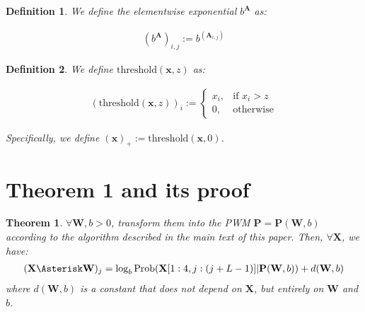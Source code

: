 \documentclass[12pt]{article}
\newcommand{\vect}[1]{\mathbf{#1}}
\newcommand{\matrixSymbol}[1]{\mathbf{#1}}
\newtheorem{theorem}{Theorem}
\newtheorem{definition}{Definition}
\begin{document}
\begin{definition}
We define the elementwise exponential ${b}^{\matrixSymbol{A}}$ as:

\begin{align}
\left( {b}^{\matrixSymbol{A}} \right)_{i, j} := {b}^{\left( \matrixSymbol{A}_{i, j} \right)}
\end{align}
\end{definition}

\begin{definition}
We define $\mathrm{threshold}(\vect{x}, z)$ as:

\begin{align}
(\mathrm{threshold}(\vect{x}, z))_{i} := \begin{cases}x_i, & \text{if } x_i > z \\ 0, & \text{otherwise} \end{cases}
\end{align}

Specifically, we define $(\vect{x})_{+} := \mathrm{threshold}(\vect{x}, 0)$.
\end{definition}




\section{Theorem 1 and its proof}

\begin{theorem}
$\forall \matrixSymbol{W}, b > 0 $, transform them into the PWM $\matrixSymbol{P}=\matrixSymbol{P}(\matrixSymbol{W}, b)$ according to the algorithm described in the main text of this paper. Then, $\forall \matrixSymbol{X}$, we have: 
\begin{align}
 (\matrixSymbol{X} \Asterisk \matrixSymbol{W})_j = \log_b{\mathrm{Prob}(\matrixSymbol{X}[1:4, j:(j+L-1)]|\matrixSymbol{P}(\matrixSymbol{W}, b))} + d(\matrixSymbol{W}, b)
\end{align}
where $d(\matrixSymbol{W}, b)$ is a constant that does not depend on $\matrixSymbol{X}$, but entirely on $\matrixSymbol{W}$ and $b$.
\end{theorem}
\end{document}
